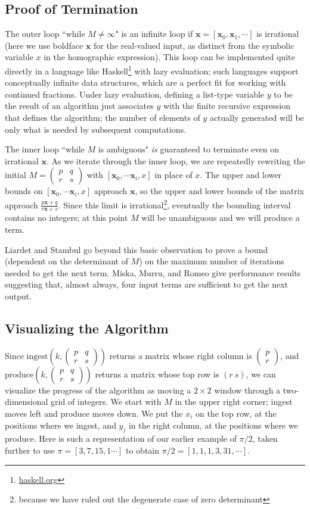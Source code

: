 \documentclass[11pt, oneside]{amsart}   	%
\newcommand{\pqrs}{\left(
\begin{smallmatrix} 
p & q\\ 
r & s 
\end{smallmatrix}
\right)}
\renewcommand{\:}{\negthickspace:\negthickspace}
\begin{document}
\subsection{Proof of Termination}\label{sec:oneCF}
The outer loop ``while $M \neq \infty$" is an infinite loop if $\mathbf{x} = [\mathbf{x}_0, \mathbf{x}_1,\cdots]$ is irrational
(here we use boldface $\mathbf{x}$ for the real-valued input, as distinct from the symbolic variable $x$ in the homographic
expression). This loop can be implemented quite directly in a language like Haskell\footnote{\href{https://haskell.org}{haskell.org}} with
lazy evaluation\cite{hutton2007programming}; such languages support conceptually infinite data structures, which are a perfect fit for working with continued
fractions. Under lazy evaluation, defining a list-type variable $y$ to be the result of an algorithm just associates $y$ with the finite recursive
expression that defines the algorithm; the number of elements of $y$ actually generated will be only what is needed by subsequent computations.

The inner loop ``while $M$ is ambiguous" \emph{is} guaranteed to terminate even on irrational $\mathbf{x}$. As
we iterate through the inner loop, we are repeatedly rewriting the initial $M = \pqrs$
with $[\mathbf{x}_0, \cdots \mathbf{x}_i, x]$ in place of $x$. The upper and lower bounds on
$[\mathbf{x}_0, \cdots \mathbf{x}_i, x]$ approach $\mathbf{x}$, so the upper and lower bounds of the matrix approach
$\frac{p\mathbf{x}+q}{r\mathbf{x}+s}$.
Since this limit is irrational\footnote{because we have ruled out the degenerate case of zero determinant}, eventually the bounding interval contains no integers; at this point $M$  will be unambiguous
 and we will produce a term.
 
 Liardet and Stambul \cite{LSAlgebraic1998} go beyond this basic observation to prove a bound (dependent on the determinant of $M$) on the maximum number of iterations needed to get the next term. Miska, Murru, and Romeo \cite{miska2025} give performance results suggesting that, almost always, four input terms are sufficient to get the next output.

\subsection{Visualizing the Algorithm}
Since $\mbox{ingest}(k,\pqrs)$ returns a matrix whose right column is
$\left( \begin{smallmatrix} p \\  r \end{smallmatrix}\right)$,
and $\mbox{produce}(k,\pqrs)$ returns a matrix whose top row is $(r\ s)$, we can visualize the progress of the algorithm
as moving a $2 \times 2$ window through a two-dimensional grid of integers.
We start with $M$ in the upper right corner; ingest moves left and produce moves down.
We put the $x_i$ on the top row, at the positions where we ingest, and $y_j$ in the right column, at the positions where we produce.
Here is such a representation of our earlier example of $\pi/2$, taken further to use $\pi = [3,7,15, 1\cdots]$ to obtain $\pi/2 = [1,1,1,3,31,\cdots]$.
\end{document}
